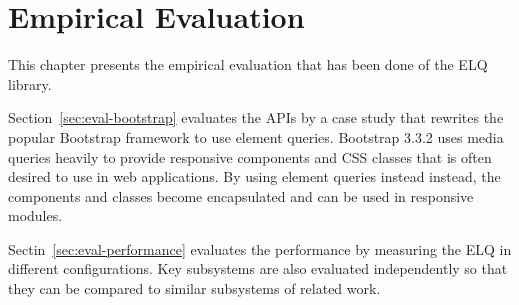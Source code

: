 \documentclass[a4paper,11pt]{kth-mag}
\begin{document}
  \chapter{Empirical Evaluation}
    This chapter presents the empirical evaluation that has been done of the \gls{ELQ} library.

    Section~\ref{sec:eval-bootstrap} evaluates the \glspl{API} by a case study that rewrites the popular \gls{Bootstrap} framework to use element queries.
    \gls{Bootstrap} 3.3.2 uses media queries heavily to provide responsive components and \gls{CSS} classes that is often desired to use in web applications.
    By using element queries instead instead, the components and classes become encapsulated and can be used in responsive modules.

    Sectin~\ref{sec:eval-performance} evaluates the performance by measuring the \gls{ELQ} in different configurations.
    Key subsystems are also evaluated independently so that they can be compared to similar subsystems of related work.



\end{document}

